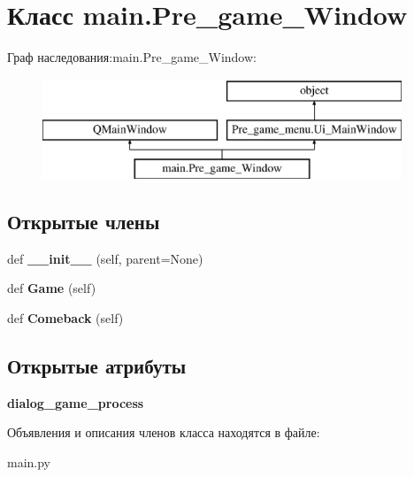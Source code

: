 \hypertarget{classmain_1_1_pre__game___window}{}\section{Класс main.\+Pre\+\_\+game\+\_\+\+Window}
\label{classmain_1_1_pre__game___window}
Граф наследования\+:main.\+Pre\+\_\+game\+\_\+\+Window\+:\begin{figure}[H]
\begin{center}
\leavevmode
\includegraphics[height=3.000000cm]{classmain_1_1_pre__game___window}
\end{center}
\end{figure}
\subsection*{Открытые члены}
\begin{DoxyCompactItemize}
\item 
\mbox{\label{classmain_1_1_pre__game___window_a36aa8d910e57f46002bdf749b4290f91}} 
def {\bfseries \+\_\+\+\_\+init\+\_\+\+\_\+} (self, parent=None)
\item 
\mbox{\label{classmain_1_1_pre__game___window_a089a4d758503837996424fb9a49518c8}} 
def {\bfseries Game} (self)
\item 
\mbox{\label{classmain_1_1_pre__game___window_a8936d10f0ec432afcffe29f114de465d}} 
def {\bfseries Comeback} (self)
\end{DoxyCompactItemize}
\subsection*{Открытые атрибуты}
\begin{DoxyCompactItemize}
\item 
\mbox{\label{classmain_1_1_pre__game___window_aa6d2a2a2df3d681d21d4282f7f49f7bb}} 
{\bfseries dialog\+\_\+game\+\_\+process}
\end{DoxyCompactItemize}


Объявления и описания членов класса находятся в файле\+:\begin{DoxyCompactItemize}
\item 
main.\+py\end{DoxyCompactItemize}
